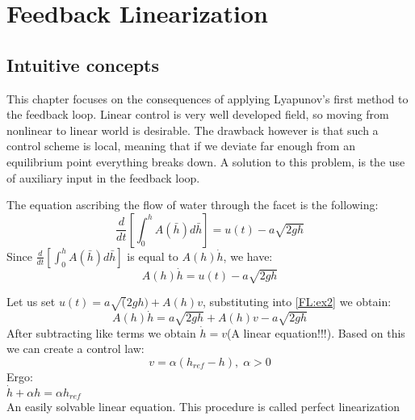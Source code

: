 
\chapter{Feedback Linearization}
\section{Intuitive concepts}
This chapter focuses on the consequences of applying Lyapunov's first method to the feedback loop.
Linear control is very well developed field, so moving from nonlinear to linear world is desirable.
The drawback however is that such a control scheme is local, meaning that if we deviate far enough
from an equilibrium point everything breaks down. A solution to this problem, is the use of 
auxiliary input in the feedback loop.


{
        The equation ascribing the flow of water through the facet is the following:
        \begin{equation}
            \label{FL:ex}
            \frac{d}{dt}[\int_0^h A(\bar{h})d\bar{h}] = u(t) - a\sqrt{2gh}
        \end{equation}
        Since $ \frac{d}{dt}[\int_0^h A(\bar{h})d\bar{h}]$ is equal to $A(h)\dot{h}$,
        we have:
        \begin{equation}
            \label{FL:ex2}
            A(h)\dot{h} = u(t) - a\sqrt{2gh}
        \end{equation}




        Let us set $u(t) = a\sqrt(2gh)+A(h)v$, substituting into  \ref{FL:ex2} we obtain:
        \begin{equation}
            \label{FL:ex_3}
            A(h)\dot{h} = a\sqrt{2gh} + A(h)v - a\sqrt{2gh}
        \end{equation}
        After subtracting like terms we obtain $\dot{h} = v$(A linear equation!!!).
        Based on this we can create a control law:
        \begin{equation}
            \label{FL:excl}
            v = \alpha(h_{ref}-h), \; \alpha > 0
        \end{equation}
        Ergo:\\
        $\dot{h}+\alpha h = \alpha h_{ref}$\\
        An easily solvable linear equation.
        This procedure is called perfect linearization
}

